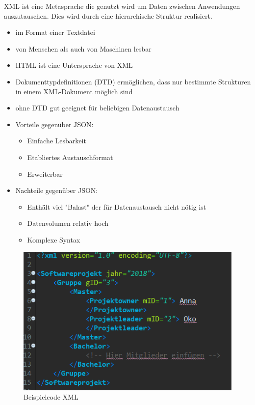 XML ist eine Metasprache die genutzt wird um Daten zwischen Anwendungen auszutauschen. Dies wird durch eine hierarchische Struktur realisiert.\\
\begin{itemize}
\item im Format einer Textdatei
\item von Menschen als auch von Maschinen lesbar
\item HTML ist eine Untersprache von XML
\item Dokumenttypdefinitionen (DTD) ermöglichen, dass nur bestimmte Strukturen in einem XML-Dokument möglich sind
\item ohne DTD gut geeignet für beliebigen Datenaustausch
\end{itemize}
\nsecend
{}
\begin{itemize} 	

	\item Vorteile gegenüber JSON:
	\begin{itemize}
		\item Einfache Lesbarkeit
		\item Etabliertes Austauschformat
		\item Erweiterbar
	\end{itemize}
	\item Nachteile gegenüber JSON:
	\begin{itemize}
		\item Enthält viel "Balast" der für Datenaustausch nicht nötig ist
		\item Datenvolumen relativ hoch
		\item Komplexe Syntax 
	\end{itemize}		
\end{itemize}
\begin{figure}
	\centering
	\includegraphics[scale=0.6]{Bilder/XML-Beispiel}
	\caption{Beispielcode XML}
	\label{fig:bild2}
\end{figure}
